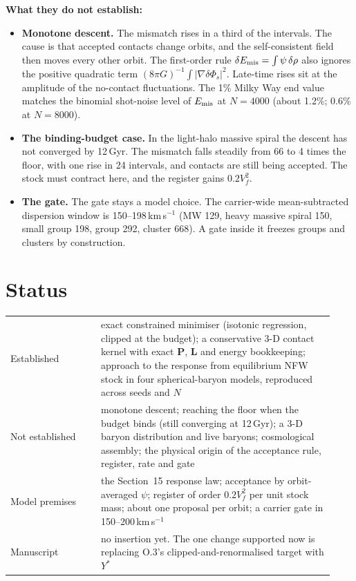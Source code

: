 \textbf{What they do not establish:}
\begin{itemize}
\item \textbf{Monotone descent.} The mismatch rises in a third of the intervals. The cause is that accepted contacts change orbits, and the self-consistent field then moves every other orbit. The first-order rule $\delta E_{\rm mis}=\int\psi\,\delta\rho$ also ignores the positive quadratic term $(8\pi G)^{-1}\!\int|\nabla\delta\Phi_s|^2$. Late-time rises sit at the amplitude of the no-contact fluctuations. The 1\% Milky Way end value matches the binomial shot-noise level of $E_{\rm mis}$ at $N=4000$ (about 1.2\%; 0.6\% at $N=8000$).
\item \textbf{The binding-budget case.} In the light-halo massive spiral the descent has not converged by 12\,Gyr. The mismatch falls steadily from 66 to 4 times the floor, with one rise in 24 intervals, and contacts are still being accepted. The stock must contract here, and the register gains $0.2V_f^2$.
\item \textbf{The gate.} The gate stays a model choice. The carrier-wide mean-subtracted dispersion window is 150--198\,km\,s$^{-1}$ (MW 129, heavy massive spiral 150, small group 198, group 292, cluster 668). A gate inside it freezes groups and clusters by construction.
\end{itemize}

\section{Status}
\begin{center}\small
\begin{tabular}{p{0.26\linewidth}p{0.67\linewidth}}\toprule
Established & exact constrained minimiser (isotonic regression, clipped at the budget); a conservative 3-D contact kernel with exact $\mathbf P$, $\mathbf L$ and energy bookkeeping; approach to the response from equilibrium NFW stock in four spherical-baryon models, reproduced across seeds and $N$\\
Not established & monotone descent; reaching the floor when the budget binds (still converging at 12\,Gyr); a 3-D baryon distribution and live baryons; cosmological assembly; the physical origin of the acceptance rule, register, rate and gate\\
Model premises & the Section~15 response law; acceptance by orbit-averaged $\psi$; register of order $0.2V_f^2$ per unit stock mass; about one proposal per orbit; a carrier gate in 150--200\,km\,s$^{-1}$\\
Manuscript & no insertion yet. The one change supported now is replacing O.3's clipped-and-renormalised target with $Y^\ast$\\
\bottomrule\end{tabular}\end{center}

